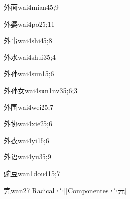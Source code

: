 \begin{verbete}{外面}{wai4mian4}{5;9}
\end{verbete}

\begin{verbete}{外婆}{wai4po2}{5;11}
\end{verbete}

\begin{verbete}{外事}{wai4shi4}{5;8}
\end{verbete}

\begin{verbete}{外水}{wai4shui3}{5;4}
\end{verbete}

\begin{verbete}{外孙}{wai4sun1}{5;6}
\end{verbete}

\begin{verbete}{外孙女}{wai4sun1nv3}{5;6;3}
\end{verbete}

\begin{verbete}{外围}{wai4wei2}{5;7}
\end{verbete}

\begin{verbete}{外协}{wai4xie2}{5;6}
\end{verbete}

\begin{verbete}{外衣}{wai4yi1}{5;6}
\end{verbete}

\begin{verbete}{外语}{wai4yu3}{5;9}
\end{verbete}

\begin{verbete}{豌豆}{wan1dou4}{15;7}
\end{verbete}

\begin{verbete}{完}{wan2}{7}[Radical 宀][Componentes 宀元]
\end{verbete}

